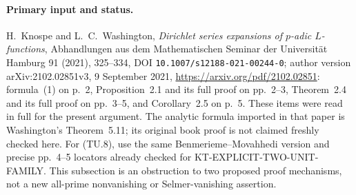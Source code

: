 \paragraph{Primary input and status.}
H.~Knospe and L.~C.~Washington, \emph{Dirichlet series
expansions of $p$-adic $L$-functions}, Abhandlungen aus dem
Mathematischen Seminar der Universit\"at Hamburg 91 (2021),
325--334, DOI \texttt{10.1007/s12188-021-00244-0}; author
version arXiv:2102.02851v3, 9 September 2021,
\url{https://arxiv.org/pdf/2102.02851}:
formula~(1) on p.~2, Proposition~2.1 and its full proof on
pp.~2--3, Theorem~2.4 and its full proof on pp.~3--5, and
Corollary~2.5 on p.~5.  These items were read in full for
the present argument.  The analytic formula imported in
that paper is Washington's Theorem~5.11; its original book
proof is not claimed freshly checked here.
For (TU.8), use the same Benmerieme--Movahhedi version and
precise pp.~4--5 locators already checked for
KT-EXPLICIT-TWO-UNIT-FAMILY.  This subsection is an
obstruction to two proposed proof mechanisms, not a new
all-prime nonvanishing or Selmer-vanishing assertion.
